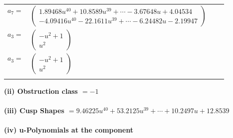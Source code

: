 \documentclass[1p]{elsarticle_modified}
\theoremstyle{definition}
\begin{document}
\begin{tabular}{m{7pt} m{180pt} m{7pt} m{180pt} }
\flushright $a_{7}=$&$\begin{pmatrix}1.89468 u^{40}+10.8589 u^{39}+\cdots-3.67648 u+4.04534\\-4.09416 u^{40}-22.1611 u^{39}+\cdots-6.24482 u-2.19947\end{pmatrix}$ \\
\flushright $a_{3}=$&$\begin{pmatrix}- u^2+1\\u^2\end{pmatrix}$\\ \flushright $a_{3}=$&$\begin{pmatrix}- u^2+1\\u^2\end{pmatrix}$\\&\end{tabular}
\flushleft \textbf{(ii) Obstruction class $= -1$}\\~\\
\flushleft \textbf{(iii) Cusp Shapes $= 9.46225 u^{40}+53.2125 u^{39}+\cdots+10.2497 u+12.8539$}\\~\\
\newpage\renewcommand{\arraystretch}{1}
\flushleft \textbf{(iv) u-Polynomials at the component}\newline \\
\end{document}
